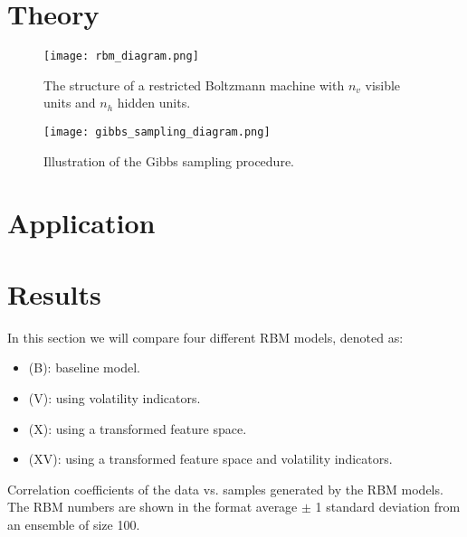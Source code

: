 \section{Theory}



\begin{figure}
    \begin{center}
        \texttt{[image: rbm\_diagram.png]}
    \end{center}
    \caption{The structure of a restricted Boltzmann machine with \( n_v \) visible units and \( n_h \) hidden units.}
    \label{fig:rbm_diagram}
\end{figure}

\begin{figure}
    \begin{center}
        \texttt{[image: gibbs\_sampling\_diagram.png]}
    \end{center}
    \caption{Illustration of the Gibbs sampling procedure.}
    \label{fig:gibbs_sampling_diagram}
\end{figure}

\section{Application}

\section{Results}
In this section we will compare four different RBM models, denoted as:
\begin{itemize}
    \item (B): baseline model.
    \item (V): using volatility indicators.
    \item (X): using a transformed feature space.
    \item (XV): using a transformed feature space and volatility indicators.
\end{itemize}

\begin{table}[ht]
    \centering
    \begin{adjustbox}{max width=\textwidth}
        
    \end{adjustbox}
    \caption{Correlation coefficients of the data vs. samples generated by the RBM models. The RBM numbers are shown in the format average \(\pm\) 1 standard deviation from an ensemble of size 100.}
    \label{tbl:rbm_correlation_coefficients}
\end{table}

